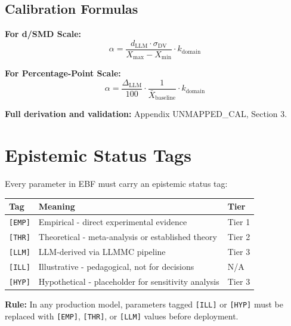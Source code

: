 \subsection{Calibration Formulas}

\textbf{For d/SMD Scale:}
$$\alpha = \frac{d_{\text{LLM}} \cdot \sigma_{\text{DV}}}{X_{\max} - X_{\min}} \cdot k_{\text{domain}}$$

\textbf{For Percentage-Point Scale:}
$$\alpha = \frac{\Delta_{\text{LLM}}}{100} \cdot \frac{1}{\bar{X}_{\text{baseline}}} \cdot k_{\text{domain}}$$

\textbf{Full derivation and validation:} Appendix UNMAPPED_CAL, Section 3.


\section{Epistemic Status Tags}
\label{sec:pm-tags}

Every parameter in EBF must carry an epistemic status tag:

\begin{center}
\begin{tabular}{lll}
\toprule
\textbf{Tag} & \textbf{Meaning} & \textbf{Tier} \\
\midrule
\texttt{[EMP]} & Empirical - direct experimental evidence & Tier 1 \\
\texttt{[THR]} & Theoretical - meta-analysis or established theory & Tier 2 \\
\texttt{[LLM]} & LLM-derived via LLMMC pipeline & Tier 3 \\
\texttt{[ILL]} & Illustrative - pedagogical, not for decisions & N/A \\
\texttt{[HYP]} & Hypothetical - placeholder for sensitivity analysis & Tier 3 \\
\bottomrule
\end{tabular}
\end{center}

\textbf{Rule:} In any production model, parameters tagged \texttt{[ILL]} or \texttt{[HYP]} must be replaced with \texttt{[EMP]}, \texttt{[THR]}, or \texttt{[LLM]} values before deployment.


